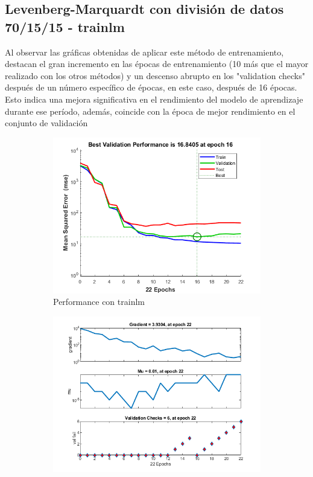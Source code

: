 \documentclass[a4paper, 12pt]{article}
\begin{document}
            \subsection{Levenberg-Marquardt con división de datos 70/15/15 - trainlm}
                Al observar las gráficas obtenidas de aplicar este método de entrenamiento, destacan el gran incremento en las épocas de entrenamiento (10 más que el mayor realizado con los otros métodos) y un descenso abrupto en los "validation checks" después de un número específico de épocas, en este caso, después de 16 épocas. Esto indica una mejora significativa en el rendimiento del modelo de aprendizaje durante ese período, además, coincide con la época de mejor rendimiento en el conjunto de validación
                \begin{figure}[htp!]
                    \caption{Gráficas con Levenberg-Marquardt con división 70/15/15}
                    \begin{subfigure}{0.49\textwidth}
                        \centering
        		      \includegraphics[width=\textwidth]{figures/parte1/Ej3/Ej3_performance_trainlm.png}
                        \caption{Performance con trainlm}
                    \end{subfigure}
                    \begin{subfigure}{0.49\textwidth}
                        \includegraphics[width=\textwidth]{figures/parte1/Ej3/Ej3_training_state_trainlm.png}

\end{subfigure}
\end{figure}
\end{document}
